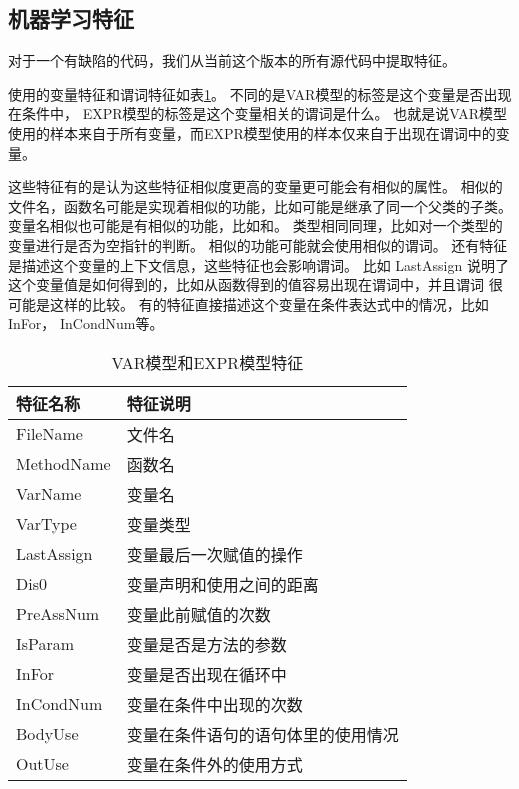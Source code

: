 \subsection{机器学习特征}

对于一个有缺陷的代码，我们从当前这个版本的所有源代码中提取特征。

使用的变量特征和谓词特征如表\ref{var_feature}。
不同的是VAR模型的标签是这个变量是否出现在条件中，
EXPR模型的标签是这个变量相关的谓词是什么。
也就是说VAR模型使用的样本来自于所有变量，而EXPR模型使用的样本仅来自于出现在谓词中的变量。

这些特征有的是认为这些特征相似度更高的变量更可能会有相似的属性。
相似的文件名，函数名可能是实现着相似的功能，比如可能是继承了同一个父类的子类。
变量名相似也可能是有相似的功能，比如和。
类型相同同理，比如对一个类型的变量进行是否为空指针的判断。
相似的功能可能就会使用相似的谓词。
还有特征是描述这个变量的上下文信息，这些特征也会影响谓词。
比如 LastAssign 说明了这个变量值是如何得到的，比如从函数得到的值容易出现在谓词中，并且谓词
很可能是这样的比较。
有的特征直接描述这个变量在条件表达式中的情况，比如 InFor， InCondNum等。


\begin{table}
\centering
\begin{tabular}{|l|l|}
\hline
特征名称 & 特征说明 \\
\hline
FileName & 文件名 \\
\hline
MethodName & 函数名 \\
\hline
VarName & 变量名 \\
\hline
VarType & 变量类型 \\
\hline
LastAssign & 变量最后一次赋值的操作 \\
\hline
Dis0 & 变量声明和使用之间的距离 \\
\hline
PreAssNum & 变量此前赋值的次数 \\
\hline
IsParam & 变量是否是方法的参数 \\
\hline
InFor & 变量是否出现在循环中 \\
\hline
InCondNum & 变量在条件中出现的次数 \\
\hline
BodyUse & 变量在条件语句的语句体里的使用情况 \\
\hline
OutUse & 变量在条件外的使用方式 \\
\hline
\end{tabular}
\caption{VAR模型和EXPR模型特征}
\label{var_feature}
\end{table}

